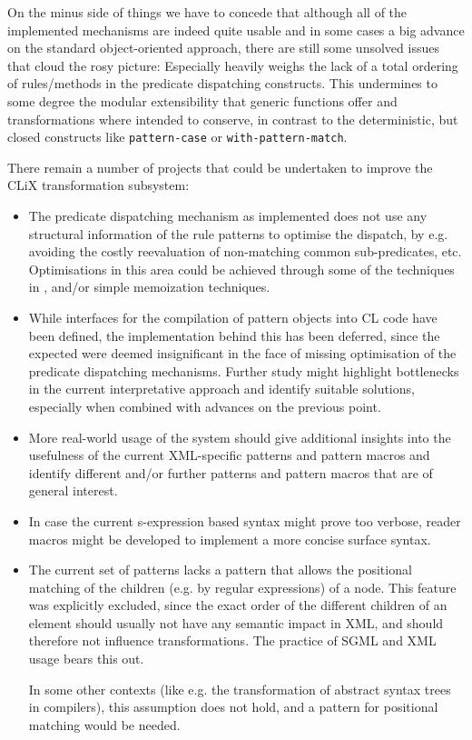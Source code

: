 \documentclass[a4paper,11pt]{scrartcl}
\begin{document}
On the minus side of things we have to concede that although all of the
implemented mechanisms are indeed quite usable and in some cases a big
advance on the standard object-oriented approach, there are still some
unsolved issues that cloud the rosy picture:  Especially heavily
weighs the lack of a total ordering of rules/methods in the predicate
dispatching constructs.  This undermines to some degree the modular
extensibility that generic functions offer and transformations where
intended to conserve, in contrast to the deterministic, but closed
constructs like \texttt{pattern-case} or \texttt{with-pattern-match}.

There remain a number of projects that could be undertaken to improve
the CLiX transformation subsystem:

\begin{itemize}
\item The predicate dispatching mechanism as implemented does not use
  any structural information of the rule patterns to optimise the
  dispatch, by e.g. avoiding the costly reevaluation of non-matching
  common sub-predicates, etc.  Optimisations in this area could be
  achieved through some of the techniques in \cite{PRED}, and/or
  simple memoization techniques.
\item While interfaces for the compilation of pattern objects into CL
  code have been defined, the implementation behind this has been
  deferred, since the expected were deemed insignificant in the face
  of missing optimisation of the predicate dispatching mechanisms.
  Further study might highlight bottlenecks in the current
  interpretative approach and identify suitable solutions, especially
  when combined with advances on the previous point.
\item More real-world usage of the system should give additional
  insights into the usefulness of the current XML-specific patterns
  and pattern macros and identify different and/or further patterns
  and pattern macros that are of general interest.
\item In case the current s-expression based syntax might prove too
  verbose, reader macros might be developed to implement a more
  concise surface syntax.
\item The current set of patterns lacks a pattern that allows the
  positional matching of the children (e.g. by regular expressions) of
  a node.  This feature was explicitly excluded, since the exact order
  of the different children of an element should usually not have any
  semantic impact in XML, and should therefore not influence
  transformations.  The practice of SGML and XML usage bears this
  out.

  In some other contexts (like e.g. the transformation of abstract
  syntax trees in compilers), this assumption does not hold, and a
  pattern for positional matching would be needed.
\end{itemize}
\end{document}
